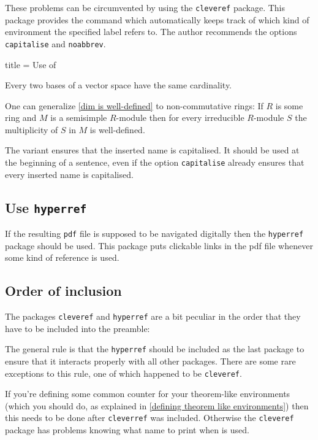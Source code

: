 \documentclass[a4paper, 10pt, headings=standardclasses, oneside, bibliography=totocnumbered]{scrbook}
\begin{document}
These problems can be circumvented by using the \texttt{cleveref} package.
This package provides the command  which automatically keeps track of which kind of environment the specified label refers to.
The author recommends the options \texttt{capitalise} and \texttt{noabbrev}.
\begin{tcblisting}{title = {Use of }}
\begin{lemma}
  \label{dim is well-defined}
  Every two bases of a vector space have the same cardinality.
\end{lemma}

\begin{remark}
  One can generalize \cref{dim is well-defined} to non-commutative rings:
  If $R$ is some ring and $M$ is a semisimple $R$-module then for every irreducible $R$-module $S$ the multiplicity of $S$ in $M$ is well-defined.
\end{remark}
\end{tcblisting}

The variant  ensures that the inserted name is capitalised.
It should be used at the beginning of a sentence, even if the option \texttt{capitalise} already ensures that every inserted name is capitalised.



\subsection{Use \texttt{hyperref}}

If the resulting \texttt{pdf} file is supposed to be navigated digitally then the \texttt{hyperref} package should be used.
This package puts clickable links in the pdf file whenever some kind of reference is used.



\subsection{Order of inclusion}

The packages \texttt{cleveref} and \texttt{hyperref} are a bit peculiar in the order that they have to be included into the preamble:

The general rule is that the \texttt{hyperref} should be included as the last package to ensure that it interacts properly with all other packages.
There are some rare exceptions to this rule, one of which happened to be \texttt{cleveref}.

If you’re defining some common counter for your theorem-like environments (which you should do, as explained in \cref{defining theorem like environments}) then this needs to be done after \texttt{cleverref} was included.
Otherwise the \texttt{cleveref} package has problems knowing what name to print when  is used.
\end{document}

